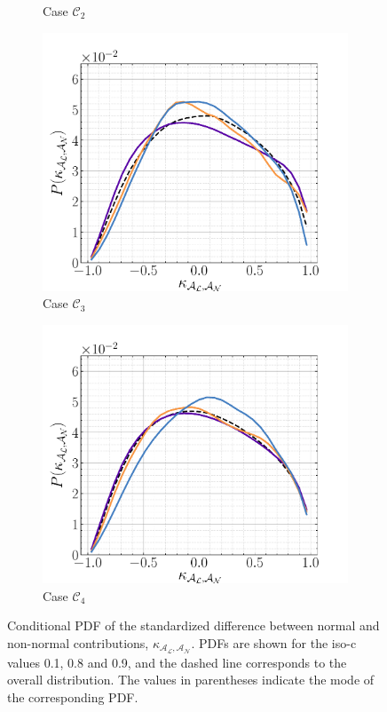 \documentclass[review,times,sort&compress]{elsarticle}
\begin{document}
\begin{figure}
\begin{subfigure}{.48\textwidth}
\caption{Case $\mathcal{C}_2$}
\label{fig:kappa_pdf_case2}
\end{subfigure}

\begin{subfigure}{.48\textwidth}
\centering
\includegraphics[width=.99\textwidth]{./figs/kappa_B_C_pdf/case3.pdf}
\caption{Case $\mathcal{C}_3$}
\label{fig:kappa_pdf_case3}
\end{subfigure}
%
\begin{subfigure}{.48\textwidth}
\centering
\includegraphics[width=.99\textwidth]{./figs/kappa_B_C_pdf/case4.pdf}
\caption{Case $\mathcal{C}_4$}
\label{fig:kappa_pdf_case4}
\end{subfigure}
\caption{Conditional PDF of the standardized difference between normal and non-normal contributions, 
$\kappa_{\mathcal{A}_{\mathcal{L}}, \mathcal{A}_{\mathcal{N}}}$. PDFs are shown for the iso-c values
0.1, 0.8 and 0.9, and the dashed line corresponds to the overall distribution. The values in parentheses
indicate the mode of the corresponding PDF.}
\label{fig:kappa_pdf}
\end{figure}
%
\end{document}
